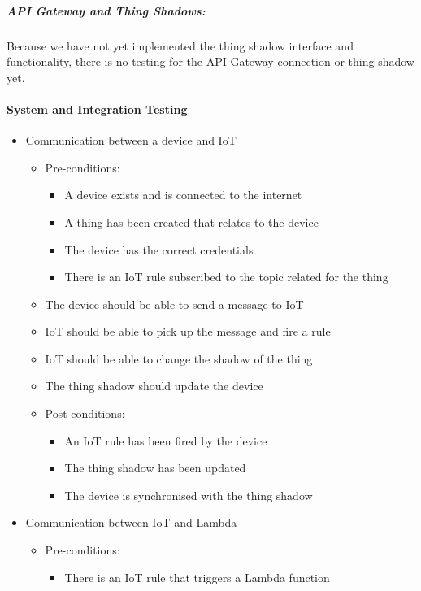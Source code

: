 \documentclass{article}
\begin{document}
				\subparagraph{API Gateway and Thing Shadows:}
				Because we have not yet implemented the thing shadow interface and functionality, there is no testing for the API Gateway connection or thing shadow yet.
				
				\paragraph{System and Integration Testing}
				\begin{itemize}
					\item{Communication between a device and IoT}
						\begin{itemize}
							\item Pre-conditions: 
							\begin{itemize}
								\item A device exists and is connected to the internet
								\item A thing has been created that relates to the device
								\item The device has the correct credentials
								\item There is an IoT rule subscribed to the topic related for the thing
							\end{itemize}
							\item The device should be able to send a message to IoT
							\item IoT should be able to pick up the message and fire a rule
							\item IoT should be able to change the shadow of the thing
							\item The thing shadow should update the device
							\item Post-conditions:
							\begin{itemize}
								\item An IoT rule has been fired by the device
								\item The thing shadow has been updated
								\item The device is synchronised with the thing shadow
							\end{itemize}
						\end{itemize}
					\item{Communication between IoT and Lambda}
					\begin{itemize}
						\item Pre-conditions: 
						\begin{itemize}
							\item There is an IoT rule that triggers a Lambda function

\end{itemize}
\end{itemize}
\end{itemize}
\end{document}
